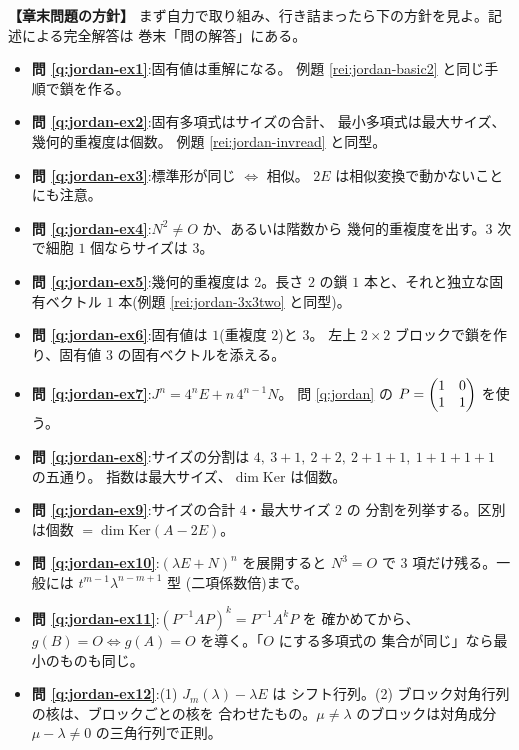 \bigskip
{\small
\noindent\textbf{【章末問題の方針】}\quad
まず自力で取り組み、行き詰まったら下の方針を見よ。記述による完全解答は
巻末「問の解答」にある。
\begin{itemize}
\item \textbf{問 \ref{q:jordan-ex1}}:固有値は重解になる。
例題 \ref{rei:jordan-basic2} と同じ手順で鎖を作る。
\item \textbf{問 \ref{q:jordan-ex2}}:固有多項式はサイズの合計、
最小多項式は最大サイズ、幾何的重複度は個数。
例題 \ref{rei:jordan-invread} と同型。
\item \textbf{問 \ref{q:jordan-ex3}}:標準形が同じ $\iff$ 相似。
$2E$ は相似変換で動かないことにも注意。
\item \textbf{問 \ref{q:jordan-ex4}}:$N^2 \neq O$ か、あるいは階数から
幾何的重複度を出す。$3$ 次で細胞 $1$ 個ならサイズは $3$。
\item \textbf{問 \ref{q:jordan-ex5}}:幾何的重複度は $2$。長さ $2$ の鎖
$1$ 本と、それと独立な固有ベクトル $1$ 本(例題 \ref{rei:jordan-3x3two}
と同型)。
\item \textbf{問 \ref{q:jordan-ex6}}:固有値は $1$(重複度 $2$)と $3$。
左上 $2 \times 2$ ブロックで鎖を作り、固有値 $3$ の固有ベクトルを添える。
\item \textbf{問 \ref{q:jordan-ex7}}:$J^n = 4^n E + n\,4^{n-1}N$。
問 \ref{q:jordan} の $P = \begin{pmatrix}1 & 0 \\ 1 & 1\end{pmatrix}$ を使う。
\item \textbf{問 \ref{q:jordan-ex8}}:サイズの分割は
$4,\ 3{+}1,\ 2{+}2,\ 2{+}1{+}1,\ 1{+}1{+}1{+}1$ の五通り。
指数は最大サイズ、$\dim \mathrm{Ker}$ は個数。
\item \textbf{問 \ref{q:jordan-ex9}}:サイズの合計 $4$・最大サイズ $2$ の
分割を列挙する。区別は個数 $= \dim \mathrm{Ker}(A - 2E)$。
\item \textbf{問 \ref{q:jordan-ex10}}:$(\lambda E + N)^n$ を展開すると
$N^3 = O$ で $3$ 項だけ残る。一般には $t^{m-1}\lambda^{n-m+1}$ 型
(二項係数倍)まで。
\item \textbf{問 \ref{q:jordan-ex11}}:$(P^{-1}AP)^k = P^{-1}A^kP$ を
確かめてから、$g(B) = O \iff g(A) = O$ を導く。「$O$ にする多項式の
集合が同じ」なら最小のものも同じ。
\item \textbf{問 \ref{q:jordan-ex12}}:(1) $J_m(\lambda) - \lambda E$ は
シフト行列。(2) ブロック対角行列の核は、ブロックごとの核を
合わせたもの。$\mu \neq \lambda$ のブロックは対角成分
$\mu - \lambda \neq 0$ の三角行列で正則。
\end{itemize}
}

